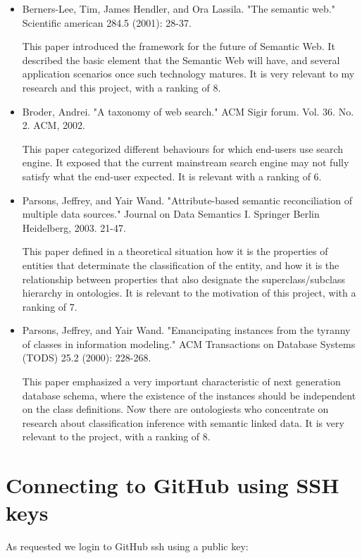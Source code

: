 \documentclass[12pt]{cls}
\begin{document}
\begin{itemize}
\item Berners-Lee, Tim, James Hendler, and Ora Lassila. "The semantic web." Scientific american 284.5 (2001): 28-37.

This paper introduced the framework for the future of Semantic Web. It described the basic element that the Semantic Web will have, and several application scenarios once such technology matures. It is very relevant to my research and this project, with a ranking of 8.

\item Broder, Andrei. "A taxonomy of web search." ACM Sigir forum. Vol. 36. No. 2. ACM, 2002.

This paper categorized different behaviours for which end-users use search engine. It exposed that the current mainstream search engine may not fully satisfy what the end-user expected. It is relevant with a ranking of 6.

\item Parsons, Jeffrey, and Yair Wand. "Attribute-based semantic reconciliation of multiple data sources." Journal on Data Semantics I. Springer Berlin Heidelberg, 2003. 21-47.

This paper defined in a theoretical situation how it is the properties of entities that determinate the classification of the entity, and how it is the relationship between properties that also designate the superclass/subclass hierarchy in ontologies. It is relevant to the motivation of this project, with a ranking of 7. 

\item Parsons, Jeffrey, and Yair Wand. "Emancipating instances from the tyranny of classes in information modeling." ACM Transactions on Database Systems (TODS) 25.2 (2000): 228-268.

This paper emphasized a very important characteristic of next generation database schema, where the existence of the instances should be independent on the class definitions. Now there are ontologiests who concentrate on research about classification inference with semantic linked data. It is very relevant to the project, with a ranking of 8.
\end{itemize}

\section{Connecting to GitHub using SSH keys}

As requested we login to GitHub ssh using a public key:
\end{document}
